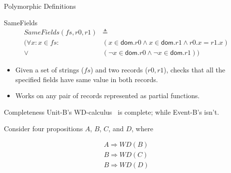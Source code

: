\documentclass[11pt]{beamer}
\newcommand{\unitb}{Unit-B\xspace}
\newcommand{\eventb}{Event-B\xspace}
\begin{document}
\begin{frame}[fragile]{Polymorphic Definitions}
  \begin{block}{SameFields}
  \begin{align*}
    {SameFields(fs, r0, r1)} & \triangleq \\
    {(\forall x: x \in fs:\ }
    & {(x \in \textsf{dom}.r0 \wedge x \in \textsf{dom}.r1 \wedge r0.x =
      r1.x)}\\
    {\vee} & {(\neg x \in \textsf{dom}.r0 \wedge \neg x
      \in \textsf{dom}.r1))}
  \end{align*}
  \end{block}
  \pause

  \begin{itemize}[<+->]
  \item Given a set of strings ($fs$) and two records
    (${r0, r1}$), checks that all the specified fields have
    same value in both records.
  \item Works on any pair of records represented as partial functions.
  \end{itemize}
\end{frame}

\begin{frame}{Completeness}
  \unitb's WD-calculus~\cite{DBLP:conf/cade/DarvasMR08} is complete;
  while \eventb's isn't.
  \pause

  \vspace{0.5cm}
  Consider four propositions $A$, $B$, $C$, and $D$, where

  \vspace{-3ex}
  \begin{eqnarray*}
    A \Rightarrow WD(B) \\
    B \Rightarrow WD(C) \\
    B \Rightarrow WD(D)
  \end{eqnarray*}
\end{frame}
\end{document}
